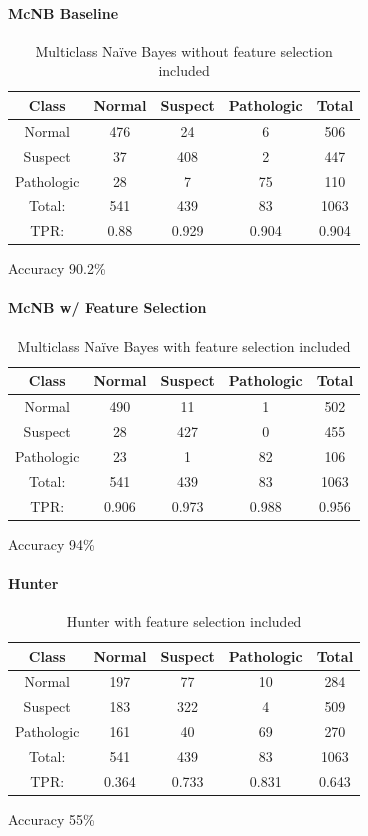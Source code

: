 \paragraph{McNB Baseline}
\begin{table}[h!]
	\centering
	\begin{tabular}{|c|c|c|c|c|}
		\hline
Class&Normal&Suspect&Pathologic&Total\\\hline
Normal&476&24&6&506\\
Suspect&37&408&2&447\\
Pathologic&28&7&75&110\\\hline
Total:&541&439&83&1063\\
TPR:&0.88&0.929&0.904&0.904\\
\hline
	\end{tabular}
	\caption[CardioNSP: Multiclass Na\"ive Bayes without Feature Selection Confusion Matrix]{Multiclass Na\"ive Bayes without feature selection included}
\label{tab:cardioNSPmcnbbase}
\end{table}
Accuracy 90.2\%
\paragraph{McNB w/ Feature Selection}
\begin{table}[h!]
	\centering
	\begin{tabular}{|c|c|c|c|c|}
		\hline
Class&Normal&Suspect&Pathologic&Total\\\hline
Normal&490&11&1&502\\
Suspect&28&427&0&455\\
Pathologic&23&1&82&106\\\hline
Total:&541&439&83&1063\\
TPR:&0.906&0.973&0.988&0.956\\
\hline
	\end{tabular}
	\caption[CardioNSP: Multiclass Na\"ive Bayes with Feature Selection Confusion Matrix]{Multiclass Na\"ive Bayes with feature selection included}
	\label{tab:cardioNSPmcnb}
\end{table}
Accuracy 94\%
\paragraph{Hunter}
\begin{table}[h!]
	\centering
	\begin{tabular}{|c|c|c|c|c|}
		\hline
		Class&Normal&Suspect&Pathologic&Total\\\hline
Normal&197&77&10&284\\
Suspect&183&322&4&509\\
Pathologic&161&40&69&270\\\hline
Total:&541&439&83&1063\\
TPR:&0.364&0.733&0.831&0.643\\
		\hline
	\end{tabular}
	\caption[CardioNSP: Hunter Confusion Matrix]{Hunter with feature selection included}
	\label{tab:cardioNSPHunter}
\end{table}
Accuracy 55\%
